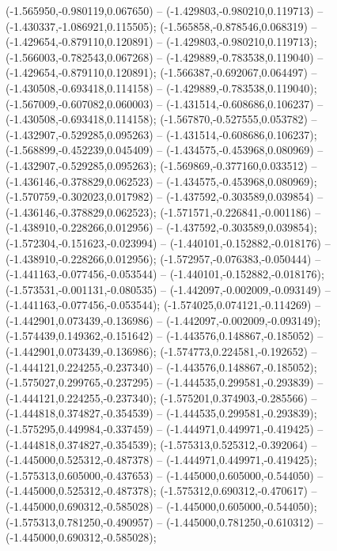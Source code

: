  (-1.565950,-0.980119,0.067650) -- (-1.429803,-0.980210,0.119713) -- (-1.430337,-1.086921,0.115505);
 (-1.565858,-0.878546,0.068319) -- (-1.429654,-0.879110,0.120891) -- (-1.429803,-0.980210,0.119713);
 (-1.566003,-0.782543,0.067268) -- (-1.429889,-0.783538,0.119040) -- (-1.429654,-0.879110,0.120891);
 (-1.566387,-0.692067,0.064497) -- (-1.430508,-0.693418,0.114158) -- (-1.429889,-0.783538,0.119040);
 (-1.567009,-0.607082,0.060003) -- (-1.431514,-0.608686,0.106237) -- (-1.430508,-0.693418,0.114158);
 (-1.567870,-0.527555,0.053782) -- (-1.432907,-0.529285,0.095263) -- (-1.431514,-0.608686,0.106237);
 (-1.568899,-0.452239,0.045409) -- (-1.434575,-0.453968,0.080969) -- (-1.432907,-0.529285,0.095263);
 (-1.569869,-0.377160,0.033512) -- (-1.436146,-0.378829,0.062523) -- (-1.434575,-0.453968,0.080969);
 (-1.570759,-0.302023,0.017982) -- (-1.437592,-0.303589,0.039854) -- (-1.436146,-0.378829,0.062523);
 (-1.571571,-0.226841,-0.001186) -- (-1.438910,-0.228266,0.012956) -- (-1.437592,-0.303589,0.039854);
 (-1.572304,-0.151623,-0.023994) -- (-1.440101,-0.152882,-0.018176) -- (-1.438910,-0.228266,0.012956);
 (-1.572957,-0.076383,-0.050444) -- (-1.441163,-0.077456,-0.053544) -- (-1.440101,-0.152882,-0.018176);
 (-1.573531,-0.001131,-0.080535) -- (-1.442097,-0.002009,-0.093149) -- (-1.441163,-0.077456,-0.053544);
 (-1.574025,0.074121,-0.114269) -- (-1.442901,0.073439,-0.136986) -- (-1.442097,-0.002009,-0.093149);
 (-1.574439,0.149362,-0.151642) -- (-1.443576,0.148867,-0.185052) -- (-1.442901,0.073439,-0.136986);
 (-1.574773,0.224581,-0.192652) -- (-1.444121,0.224255,-0.237340) -- (-1.443576,0.148867,-0.185052);
 (-1.575027,0.299765,-0.237295) -- (-1.444535,0.299581,-0.293839) -- (-1.444121,0.224255,-0.237340);
 (-1.575201,0.374903,-0.285566) -- (-1.444818,0.374827,-0.354539) -- (-1.444535,0.299581,-0.293839);
 (-1.575295,0.449984,-0.337459) -- (-1.444971,0.449971,-0.419425) -- (-1.444818,0.374827,-0.354539);
 (-1.575313,0.525312,-0.392064) -- (-1.445000,0.525312,-0.487378) -- (-1.444971,0.449971,-0.419425);
 (-1.575313,0.605000,-0.437653) -- (-1.445000,0.605000,-0.544050) -- (-1.445000,0.525312,-0.487378);
 (-1.575312,0.690312,-0.470617) -- (-1.445000,0.690312,-0.585028) -- (-1.445000,0.605000,-0.544050);
 (-1.575313,0.781250,-0.490957) -- (-1.445000,0.781250,-0.610312) -- (-1.445000,0.690312,-0.585028);
